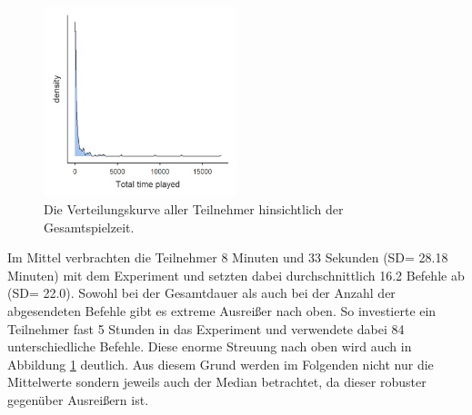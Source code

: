 \begin{figure}[htbp]
    \centering
    \includegraphics[width=0.5\textwidth]{img/auswertung/density.png}
    \caption{Die Verteilungskurve aller Teilnehmer hinsichtlich der Gesamtspielzeit.}
    \label{density}
\end{figure}

Im Mittel verbrachten die Teilnehmer 8 Minuten und 33 Sekunden (SD= 28.18 Minuten) mit dem Experiment und setzten dabei durchschnittlich 16.2 Befehle ab (SD= 22.0). Sowohl bei der Gesamtdauer als auch bei der Anzahl der abgesendeten Befehle gibt es extreme Ausreißer nach oben. So investierte ein Teilnehmer fast 5 Stunden in das Experiment und verwendete dabei 84 unterschiedliche Befehle. Diese enorme Streuung nach oben wird auch in Abbildung \ref{density} deutlich. Aus diesem Grund werden im Folgenden nicht nur die Mittelwerte sondern jeweils auch der Median betrachtet, da dieser robuster gegenüber Ausreißern ist.

